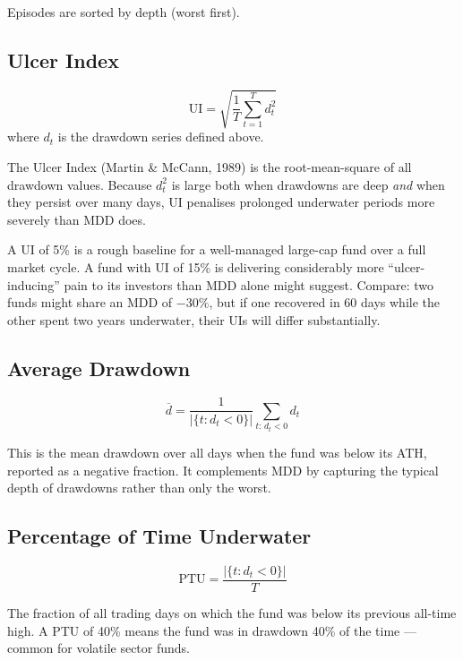 \documentclass[12pt, a4paper]{article}
\begin{document}
Episodes are sorted by depth (worst first).

\subsection{Ulcer Index}

\begin{definition}
\[
  \mathrm{UI} = \sqrt{\frac{1}{T}\sum_{t=1}^{T} d_t^2}
\]
where $d_t$ is the drawdown series defined above.
\end{definition}

The Ulcer Index (Martin \& McCann, 1989) is the root-mean-square of all
drawdown values.  Because $d_t^2$ is large both when drawdowns are deep
\emph{and} when they persist over many days, UI penalises prolonged
underwater periods more severely than MDD does.

\begin{interpretation}
A UI of 5\% is a rough baseline for a well-managed large-cap fund over a
full market cycle.  A fund with UI of 15\% is delivering considerably
more ``ulcer-inducing'' pain to its investors than MDD alone might suggest.
Compare: two funds might share an MDD of $-30\%$, but if one recovered in
60 days while the other spent two years underwater, their UIs will differ
substantially.
\end{interpretation}

\subsection{Average Drawdown}

\[
  \overline{d} = \frac{1}{|\{t: d_t < 0\}|} \sum_{t:\, d_t < 0} d_t
\]

This is the mean drawdown over all days when the fund was below its ATH,
reported as a negative fraction.  It complements MDD by capturing the
typical depth of drawdowns rather than only the worst.

\subsection{Percentage of Time Underwater}

\[
  \text{PTU} = \frac{|\{t : d_t < 0\}|}{T}
\]

The fraction of all trading days on which the fund was below its previous
all-time high.  A PTU of 40\% means the fund was in drawdown 40\% of the
time — common for volatile sector funds.
\end{document}
